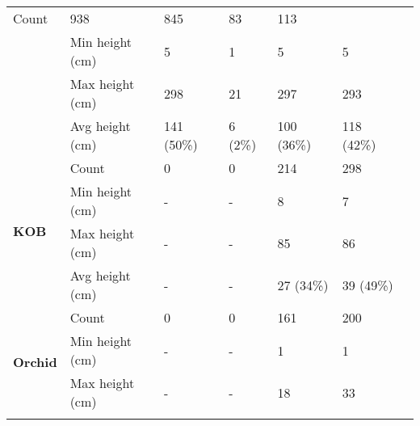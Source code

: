 \begin{longtable}{|p{2cm}|p{2cm}|p{2cm}|p{2cm}|p{2cm}|p{2cm}|p{2cm}|}
						\multicolumn{1}{l|}{Count} & 
						\multicolumn{1}{l|}{938} & 
						\multicolumn{1}{l|}{845} &
						\multicolumn{1}{l|}{83} & 
						\multicolumn{1}{l|}{113} \\\cline{2-7} &
						\multicolumn{1}{l|}{Min height (cm)} & 
						\multicolumn{1}{l|}{5} & 
						\multicolumn{1}{l|}{1} &
						\multicolumn{1}{l|}{5} & 
						\multicolumn{1}{l|}{5} \\\cline{2-7} &
						\multicolumn{1}{l|}{Max height (cm)} & 
						\multicolumn{1}{l|}{298} & 
						\multicolumn{1}{l|}{21} &
						\multicolumn{1}{l|}{297} & 
						\multicolumn{1}{l|}{293} \\\cline{2-7} &
						\multicolumn{1}{l|}{Avg height (cm)} & 
						\multicolumn{1}{l|}{141 (50\%)} & 
						\multicolumn{1}{l|}{6 (2\%)} &
						\multicolumn{1}{l|}{100 (36\%)} & 
						\multicolumn{1}{l|}{118 (42\%)} \\\cline{2-7}
		\hline      
		\multirow{4}{*}{\textbf{KOB}} & 
						\multicolumn{1}{l|}{Count} & 
						\multicolumn{1}{l|}{0} & 
						\multicolumn{1}{l|}{0} &
						\multicolumn{1}{l|}{214} & 
						\multicolumn{1}{l|}{298} \\\cline{2-7} &
						\multicolumn{1}{l|}{Min height (cm)} & 
						\multicolumn{1}{l|}{-} & 
						\multicolumn{1}{l|}{-} &
						\multicolumn{1}{l|}{8} & 
						\multicolumn{1}{l|}{7} \\\cline{2-7} &
						\multicolumn{1}{l|}{Max height (cm)} & 
						\multicolumn{1}{l|}{-} & 
						\multicolumn{1}{l|}{-} &
						\multicolumn{1}{l|}{85} & 
						\multicolumn{1}{l|}{86} \\\cline{2-7} &
						\multicolumn{1}{l|}{Avg height (cm)} & 
						\multicolumn{1}{l|}{-} & 
						\multicolumn{1}{l|}{-} &
						\multicolumn{1}{l|}{27 (34\%)} & 
						\multicolumn{1}{l|}{39 (49\%)} \\\cline{2-7}
		\hline     
		\multirow{4}{*}{\textbf{Orchid}} & 
						\multicolumn{1}{l|}{Count} & 
						\multicolumn{1}{l|}{0} & 
						\multicolumn{1}{l|}{0} &
						\multicolumn{1}{l|}{161} & 
						\multicolumn{1}{l|}{200} \\\cline{2-7} &
						\multicolumn{1}{l|}{Min height (cm)} & 
						\multicolumn{1}{l|}{-} & 
						\multicolumn{1}{l|}{-} &
						\multicolumn{1}{l|}{1} & 
						\multicolumn{1}{l|}{1} \\\cline{2-7} &
						\multicolumn{1}{l|}{Max height (cm)} & 
						\multicolumn{1}{l|}{-} & 
						\multicolumn{1}{l|}{-} &
						\multicolumn{1}{l|}{18} & 
						\multicolumn{1}{l|}{33} \\\cline{2-7} &

\end{longtable}

